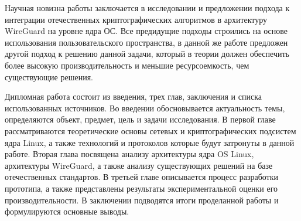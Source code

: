 Научная новизна работы заключается в исследовании и предложении подхода к интеграции отечественных криптографических алгоритмов в архитектуру WireGuard на уровне ядра ОС.
Все предидущие подходы строились на основе использования пользовательского пространства, в данной же работе предложен другой подход к решению данной задачи, который в теории должен обеспечить более высокую производительность и меньшие ресурсоемкость, чем существующие решения.

Дипломная работа состоит из введения, трех глав, заключения и списка использованных источников.
Во введении обосновывается актуальность темы, определяются объект, предмет, цель и задачи исследования.
В первой главе рассматриваются теоретические основы сетевых и криптографических подсистем ядра Linux, а также технологий и протоколов которые будут затронуты в данной работе.
Вторая глава посвящена анализу архитектуры ядра OS Linux, архитектуры WireGuard, а также анализу существующих решений на базе отечественных стандартов.
В третьей главе описывается процесс разработки прототипа, а также представлены результаты экспериментальной оценки его производительности.
В заключении подводятся итоги проделанной работы и формулируются основные выводы.
